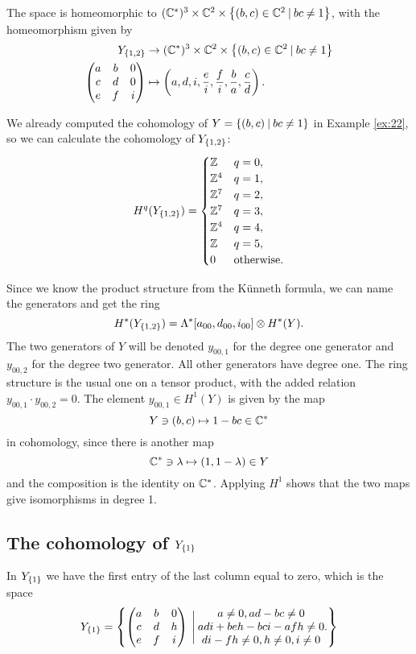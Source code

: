 The space is homeomorphic to $(\mathbb{C}^*)^3\times \mathbb{C}^2
\times \left\{ (b,c)\in\mathbb{C}^2 \: \vert \: bc\neq 1 \right\}$, with the
homeomorphism given by
\begin{align*}
  Y_{\left\{ 1,2 \right\}} &\to (\mathbb{C}^*)^3\times \mathbb{C}^2
  \times \left\{ (b,c)\in\mathbb{C}^2 \: \vert \: bc\neq 1 \right\} \\
  \begin{pmatrix}
    a & b & 0 \\
    c & d & 0 \\
    e & f & i
  \end{pmatrix} &\mapsto \left(a,d,i,\frac{e}{i},\frac{f}{i},
    \frac{b}{a}, \frac{c}{d}\right).
\end{align*}

We already computed the cohomology of $Y =\left\{ (b,c)\: \vert\:
  bc\neq 1 \right\}$ in Example \ref{ex:22}, so we can calculate the
cohomology of $Y_{\left\{ 1,2 \right\}}$:
\[ H^q(Y_{\left\{ 1,2 \right\}}) =
\begin{cases}
  \mathbb{Z} & q = 0, \\
  \mathbb{Z}^4 & q = 1, \\
  \mathbb{Z}^7 & q = 2, \\
  \mathbb{Z}^7 & q = 3, \\
  \mathbb{Z}^4 & q = 4, \\
  \mathbb{Z} & q = 5, \\
  0 & \text{otherwise}.
\end{cases} \]

Since we know the product structure from the K\"unneth formula, we can
name the generators and get the ring 
\[ H^*(Y_{\left\{ 1,2 \right\}}) = \Lambda^*[a_{00},d_{00},i_{00}]\otimes
H^*(Y). \]
The two generators of $Y$ will be denoted $y_{00,1}$ for the degree
one generator and $y_{00,2}$ for the degree two generator. All other
generators have degree one. The ring
structure is the usual one on a tensor product, with the added
relation $y_{00,1}\cdot y_{00,2} = 0$. The element $y_{00,1}\in H^1(Y)$
is given by the map
\[ Y\ni (b,c) \mapsto 1-bc\in \mathbb{C}^* \]
in cohomology, since there is another map
\[ \mathbb{C}^* \ni \lambda \mapsto (1,1-\lambda) \in Y \]
and the composition is the identity on $\mathbb{C}^*$. Applying $H^1$ shows
that the two maps give isomorphisms in degree 1.


\subsection{The cohomology of $Y_{\left\{ 1 \right\}}$}

In $Y_{\left\{ 1 \right\}}$ we have the first entry of the last column equal to
zero, which is the space
\[ Y_{\left\{ 1 \right\}} = \left\{ 
  \begin{pmatrix}
    a & b & 0 \\
    c & d & h \\
    e & f & i
  \end{pmatrix} \:\Bigg\vert\:
  \begin{matrix}
    a \neq 0, ad-bc \neq 0 \\
    adi + beh - bci - afh \neq 0 \\
    di -fh \neq 0, h \neq 0, i \neq 0 
  \end{matrix}.
 \right\} \]

